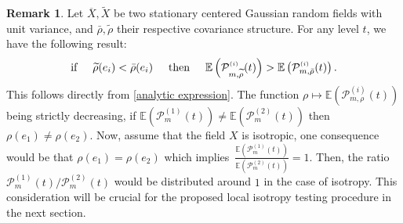\documentclass[12pt]{article}
\renewcommand{\tilde}{\widetilde}
\theoremstyle{Theorem}
\theoremstyle{definition}
\newtheorem{remark}{Remark}
\begin{document}
\begin{remark}
\label{powertest}
Let $\overline{X}, \tilde{X}$ be two stationary centered Gaussian random fields with unit variance, and $\bar{\rho}, \tilde{\rho}$ their respective covariance structure. For any level $t$, we  have the following result:
\begin{equation*}
 \text{if} \hspace{0.5cm} \tilde{\rho}(e_i) < \bar{\rho}(e_i) \hspace{0.5cm} \text{then} \hspace{0.5cm}\mathbb{E}\left(\mathcal{P}^{\scriptscriptstyle (i)}_{m, \tilde{\rho}}(t)\right) > \mathbb{E}\left(\mathcal{P}^{\scriptscriptstyle (i)}_{m, \bar{\rho}}(t)\right).
\end{equation*}
This follows directly from \ref{analytic expression}. The function $\rho \mapsto \mathbb{E}\left(\mathcal{P}^{\scriptscriptstyle (i)}_{m, \rho}(t)\right)$ being strictly decreasing, if $\mathbb{E}\left(\mathcal{P}^{\scriptscriptstyle (1)}_{m}(t)\right) \neq \mathbb{E}\left(\mathcal{P}^{\scriptscriptstyle (2)}_{m}(t)\right)$ then~$\rho(e_1) \neq \rho(e_2) $. Now, assume that the field $X$ is isotropic, one consequence would be that $\rho(e_{1}) = \rho(e_{2})$ which implies~$\frac{\mathbb{E}\left(\mathcal{P}^{\scriptscriptstyle (1)}_{m}(t)\right)}{\mathbb{E}\left(\mathcal{P}^{\scriptscriptstyle (2)}_{m}(t)\right)} = 1$. Then, the ratio $\mathcal{P}^{\scriptscriptstyle  (1)}_{m}(t)/\mathcal{P}^{\scriptscriptstyle  (2)}_{m}(t)$ would be distributed around $1$ in the case of isotropy. This consideration will be crucial for the proposed local isotropy testing procedure in the next section.
\end{remark}
\end{document}
